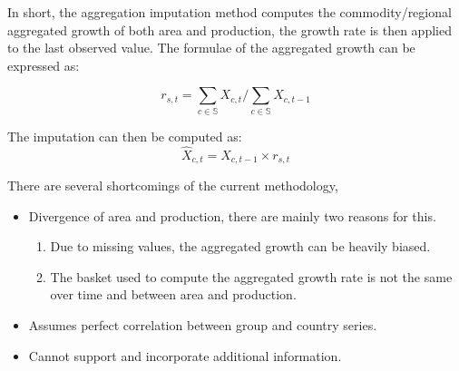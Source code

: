 \documentclass{beamer}
\begin{document}
\begin{frame}

  In short, the aggregation imputation method computes the
  commodity/regional aggregated growth of both area and production,
  the growth rate is then applied to the last observed value. The
  formulae of the aggregated growth can be expressed as:
  
  \begin{equation}
    \label{eq:aggregateGrowth}
    r_{s, t} = \sum_{c \in \mathbb{S}} X_{c, t}/\sum_{c \in \mathbb{S}} X_{c, t-1}
  \end{equation}
  
  The imputation can then be computed as:
  \begin{equation}
    \hat{X}_{c, t} = X_{c, t-1} \times r_{s, t}
  \end{equation}
  
\end{frame}

\begin{frame}
  There are several shortcomings of the current methodology,
  \begin{itemize}
  \item Divergence of area and production, there are mainly two reasons for this.
    \begin{enumerate}
      \item Due to missing values, the aggregated growth can be heavily biased.
      \item The basket used to compute the aggregated growth rate is
        not the same over time and between area and production.
    \end{enumerate}
  \item Assumes perfect correlation between group and country series.
  \item Cannot support and incorporate additional information.
  \end{itemize}
\end{frame}



\end{document}
